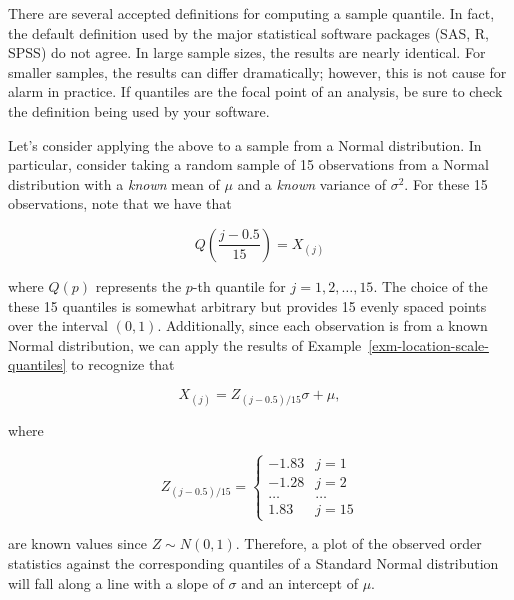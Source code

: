 \documentclass[
  letterpaper,
  DIV=11,
  numbers=noendperiod]{scrreprt}
\theoremstyle{definition}
\theoremstyle{plain}
\theoremstyle{definition}
\theoremstyle{remark}
\begin{document}
\begin{tcolorbox}[enhanced jigsaw, rightrule=.15mm, leftrule=.75mm, opacityback=0, coltitle=black, bottomrule=.15mm, opacitybacktitle=0.6, left=2mm, colframe=quarto-callout-note-color-frame, breakable, colback=white, arc=.35mm, toprule=.15mm, toptitle=1mm, bottomtitle=1mm, title=\textcolor{quarto-callout-note-color}{\faInfo}\hspace{0.5em}{Note}, titlerule=0mm, colbacktitle=quarto-callout-note-color!10!white]

There are several accepted definitions for computing a sample quantile.
In fact, the default definition used by the major statistical software
packages (SAS, R, SPSS) do not agree. In large sample sizes, the results
are nearly identical. For smaller samples, the results can differ
dramatically; however, this is not cause for alarm in practice. If
quantiles are the focal point of an analysis, be sure to check the
definition being used by your software.

\end{tcolorbox}

Let's consider applying the above to a sample from a Normal
distribution. In particular, consider taking a random sample of 15
observations from a Normal distribution with a \emph{known} mean of
\(\mu\) and a \emph{known} variance of \(\sigma^2\). For these 15
observations, note that we have that

\[Q\left(\frac{j - 0.5}{15}\right) = X_{(j)}\]

where \(Q(p)\) represents the \(p\)-th quantile for
\(j = 1,2,\dotsc, 15\). The choice of the these 15 quantiles is somewhat
arbitrary but provides 15 evenly spaced points over the interval
\((0, 1)\). Additionally, since each observation is from a known Normal
distribution, we can apply the results of
Example~\ref{exm-location-scale-quantiles} to recognize that

\[X_{(j)} = Z_{(j - 0.5)/15} \sigma + \mu,\]

where

\[Z_{(j - 0.5)/15} = \begin{cases} -1.83 & j = 1 \\ -1.28 & j = 2 \\ \dotsc & \dotsc \\ 1.83 & j = 15\end{cases}\]

are known values since \(Z \sim N(0, 1)\). Therefore, a plot of the
observed order statistics against the corresponding quantiles of a
Standard Normal distribution will fall along a line with a slope of
\(\sigma\) and an intercept of \(\mu\).
\end{document}
